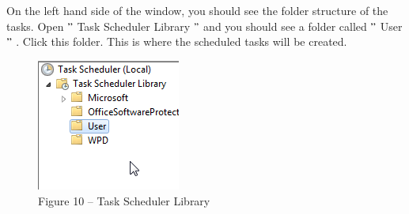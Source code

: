 \documentclass[a4paper,12pt]{report}
\begin{document}


\vspace{12pt}
 \par
\begin{myEnumerate}
\item On the left hand side of the window, you should see the folder structure of the tasks. Open  $ " $ Task Scheduler Library $ " $  and you should see a folder called  $ " $ User $ " $ . Click this folder. This is where the scheduled tasks will be created. \par




\begin{figure}[H]
\begin{center}
\includegraphics[width=1.85in,height=1.7in]{./uploads_new/ENF_Alert_Emails.docx_DIR/media/image16.png}
\end{center}
\caption{Figure 10 – Task Scheduler Library}
\end{figure}




\vspace{12pt}
\end{myEnumerate}
 \par
\end{document}
